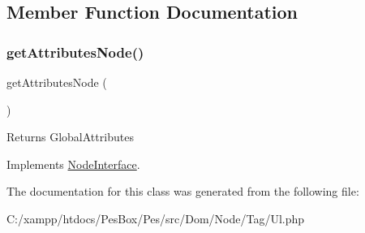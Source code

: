 \subsection{Member Function Documentation}
\mbox{\label{class_pes_1_1_dom_1_1_node_1_1_tag_1_1_ul_a4722e7722b245351681b05d35f6694f3}} 
\subsubsection{\texorpdfstring{get\+Attributes\+Node()}{getAttributesNode()}}
{\footnotesize\ttfamily get\+Attributes\+Node (\begin{DoxyParamCaption}{ }\end{DoxyParamCaption})}

\begin{DoxyReturn}{Returns}
Global\+Attributes 
\end{DoxyReturn}


Implements \mbox{\hyperlink{interface_pes_1_1_dom_1_1_node_1_1_node_interface_a4722e7722b245351681b05d35f6694f3}{Node\+Interface}}.



The documentation for this class was generated from the following file\+:\begin{DoxyCompactItemize}
\item 
C\+:/xampp/htdocs/\+Pes\+Box/\+Pes/src/\+Dom/\+Node/\+Tag/Ul.\+php\end{DoxyCompactItemize}
